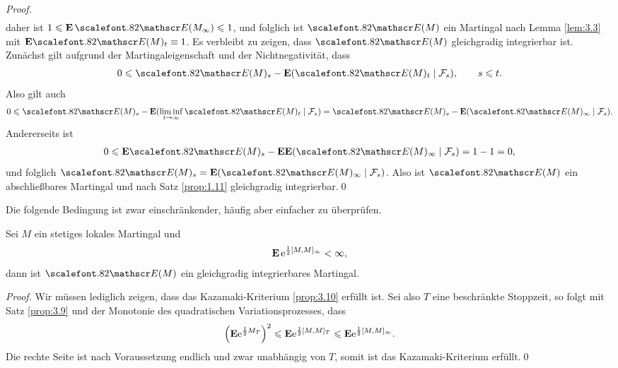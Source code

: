 \begin{proof}
\begin{align*}
\end{align*}
daher ist $1\le \E\, \Ep(M_\infty)\le 1$, und
folglich ist $\Ep(M)$ ein Martingal nach Lemma \ref{lem:3.3} mit $\E
\Ep(M)_t \equiv 1$.
Es verbleibt zu zeigen, dass $\Ep(M)$ gleichgradig integrierbar ist. Zunächst gilt aufgrund der
Martingaleigenschaft und der Nichtnegativität, dass
\begin{align*}
0 \le \Ep(M)_s - \E(\Ep(M)_t\mid \FF_s),\qquad s\le t.
\end{align*}
Also gilt auch
\begin{align*}
0\le \Ep(M)_s - \E(\liminf_{t\to \infty}\Ep(M)_t\mid \FF_s)
= 
\Ep(M)_s - \E(\Ep(M)_\infty\mid \FF_s).
\end{align*}
Andererseits ist
\begin{align*}
0 \le \E\Ep(M)_s - \E\E(\Ep(M)_\infty\mid \FF_s) = 1-1
= 0,
\end{align*}
und folglich $\Ep(M)_s =\E(\Ep(M)_\infty\mid \FF_s)$. Also ist $\Ep(M)$ ein
abschließbares Martingal und nach Satz \ref{prop:1.11} gleichgradig
integrierbar.\qed
\end{proof}

Die folgende Bedingung ist zwar einschränkender, häufig aber einfacher zu
überprüfen.

\begin{theorem}
\label{prop:3.11}
Sei $M$ ein stetiges lokales Martingal und
\begin{align*}
\mathbf{E}\, \mathrm{e}^{\frac{1}{2}[M,M]_\infty} < \infty,
\end{align*}
dann ist $\Ep(M)$ ein gleichgradig integrierbares Martingal.\fish
\end{theorem}
\begin{proof}
Wir müssen lediglich zeigen, dass das Kazamaki-Kriterium \ref{prop:3.10} erfüllt
ist. Sei also $T$ eine beschränkte Stoppzeit, so folgt mit Satz \ref{prop:3.9}
und der Monotonie des quadratischen Variationsprozesses, dass
\begin{align*}
\left(\mathbf{E} \mathrm{e}^{\frac{1}{2}M_T}\right)^2 \leqslant
\mathbf{E} \mathrm{e}^{\frac{1}{2}[M,M]_T} 
\leqslant
\mathbf{E} \mathrm{e}^{\frac{1}{2}[M,M]_\infty}.
\end{align*}
Die rechte Seite ist nach Voraussetzung endlich und zwar unabhängig von $T$,
somit ist das Kazamaki-Kriterium erfüllt.\qed
\end{proof}

